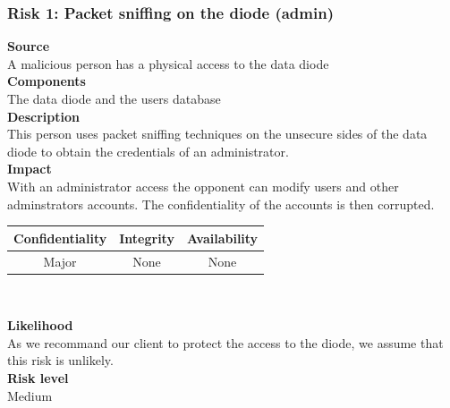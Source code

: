 \documentclass[a4paper,11pt]{article}
\begin{document}
\subsubsection{Risk 1: Packet sniffing on the diode (admin) }
\textbf{Source} \\A malicious person has a physical access to the data diode\\
\textbf{Components} \\The data diode and the users database\\
\textbf{Description}\\ This person uses packet sniffing techniques on the unsecure sides of the data diode to obtain the credentials of an administrator. \\
\textbf{Impact}\\
With an administrator access the opponent can modify users and other adminstrators accounts. The confidentiality of the accounts is then corrupted.\\
\begin{center}

\begin{tabular}{|c|c|c|}
\hline
\textbf{Confidentiality} & \textbf{Integrity} & \textbf{Availability} \\
\hline
Major & None & None \\
\hline
\end{tabular}\\
\end{center}
\textbf{Likelihood}\\ As we recommand our client to protect the access to the diode, we assume that this risk is unlikely.\\
\textbf{Risk level}\\Medium\\
\end{document}
